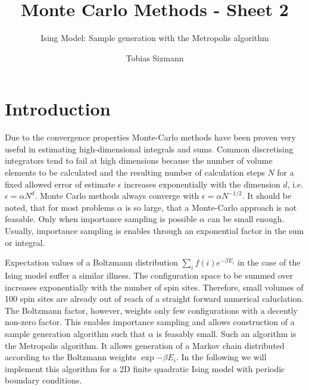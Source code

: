 \documentclass[11pt, a4paper]{scrartcl}
\title{Monte Carlo Methods - Sheet 2}
\subtitle{Ising Model: Sample generation with the Metropolis algorithm}
\author{Tobias Sizmann}
\begin{document}
\maketitle
\section{Introduction}
Due to the convergence properties Monte-Carlo methods have been proven very useful in estimating high-dimensional integrals and sums. Common discretising integrators tend to fail at high dimensions because the number of volume elements to be calculated and the resulting number of calculation steps $N$ for a fixed allowed error of estimate $\epsilon$ increases exponentially with the dimension $d$, i.e. $\epsilon = \alpha N^d$. Monte Carlo methods always converge with $\epsilon = \alpha N^{-1/2}$. It should be noted, that for most problems $\alpha$ is so large, that a Monte-Carlo approach is not feasable. Only when importance sampling is possible $\alpha$ can be small enough. Usually, importance sampling is enables through an exponential factor in the sum or integral.

Expectation values of a Boltzmann distribution $\sum_i f(i) e^{-\beta E_i}$ in the case of the Ising model suffer a similar illness. The configuration space to be summed over increases exponentially with the number of spin sites. Therefore, small volumes of 100 spin sites are already out of reach of a straight forward numerical caluclation. The Boltzmann factor, however, weights only few configurations with a decently non-zero factor. This enables importance sampling and allows construction of a sample generation algorithm such that $\alpha$ is feasably small. Such an algorithm is the Metropolis algorithm. It allows generation of a Markov chain distributed according to the Boltzmann weights $\exp{-\beta E_i}$. In the following we will implement this algorithm for a 2D finite quadratic Ising model with periodic boundary conditions.
\end{document}
